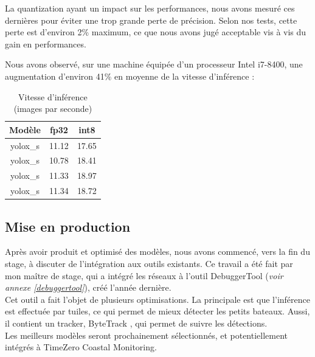 La quantization ayant un impact sur les performances, nous avons mesuré ces dernières pour
éviter une trop grande perte de précision. Selon nos tests, cette perte est d'environ 2\% maximum,
ce que nous avons jugé acceptable vis à vis du gain en performances.

Nous avons observé, sur une machine équipée d'un processeur Intel i7-8400, une augmentation d'environ
41\% en moyenne de la vitesse d'inférence : \\

\begin{table}[!h]
    \caption{Vitesse d'inférence (images par seconde)}
    \begin{center}
    \begin{tabular}{c c c}
        \hline
        Modèle & fp32 & int8 \\ \hline
        yolox\_s & 11.12 & 17.65 \\
        yolox\_s & 10.78 & 18.41 \\
        yolox\_s & 11.33 & 18.97 \\
        yolox\_s & 11.34 & 18.72 \\ \hline
    \end{tabular}
\end{center}
\end{table}

\pagebreak

\subsection{Mise en production}

Après avoir produit et optimisé des modèles, nous avons commencé, vers la fin du stage,
à discuter de l'intégration aux outils existants. Ce travail a été fait par mon maître de stage,
qui a intégré les réseaux à l'outil DebuggerTool (\textit{voir annexe \ref{debuggertool}}),
créé l'année dernière.\\

Cet outil a fait l'objet de plusieurs optimisations. La principale est que l'inférence est effectuée par tuiles,
ce qui permet de mieux détecter les petits bateaux. Aussi, il contient un tracker, ByteTrack \cite{Zhang_Sun_Jiang_Yu_Weng_Yuan_Luo_Liu_Wang_2022},
qui permet de suivre les détections.\\

Les meilleurs modèles seront prochainement sélectionnés,
et potentiellement intégrés à TimeZero Coastal Monitoring.
